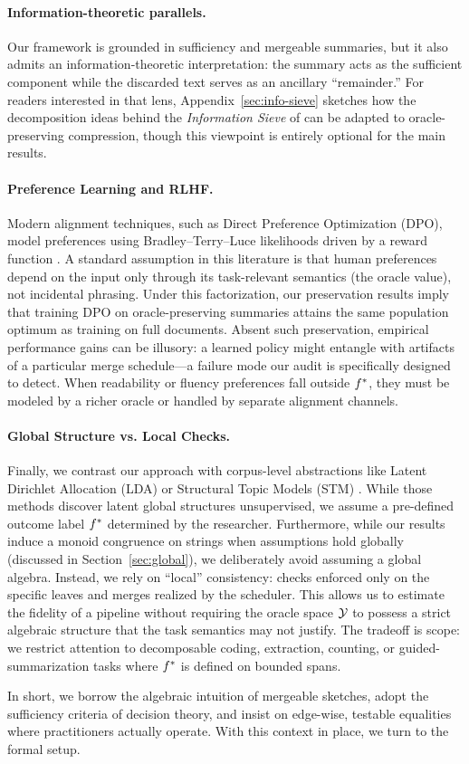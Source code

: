 \paragraph{Information-theoretic parallels.}
Our framework is grounded in sufficiency and mergeable summaries, but it also admits an information-theoretic interpretation: the summary acts as the sufficient component while the discarded text serves as an ancillary ``remainder.'' For readers interested in that lens, Appendix~\ref{sec:info-sieve} sketches how the decomposition ideas behind the \emph{Information Sieve} of \citet{steeg2016informationsieve} can be adapted to oracle-preserving compression, though this viewpoint is entirely optional for the main results.

\paragraph{Preference Learning and RLHF.}
Modern alignment techniques, such as Direct Preference Optimization (DPO), model preferences using Bradley–Terry–Luce likelihoods driven by a reward function \citep{BradleyTerry1952,RafailovEtAl2023DPO}. A standard assumption in this literature is that human preferences depend on the input only through its task-relevant semantics (the oracle value), not incidental phrasing. Under this factorization, our preservation results imply that training DPO on oracle-preserving summaries attains the same population optimum as training on full documents. Absent such preservation, empirical performance gains can be illusory: a learned policy might entangle with artifacts of a particular merge schedule---a failure mode our audit is specifically designed to detect. When readability or fluency preferences fall outside $f^{\ast}$, they must be modeled by a richer oracle or handled by separate alignment channels.

\paragraph{Global Structure vs. Local Checks.}
Finally, we contrast our approach with corpus-level abstractions like Latent Dirichlet Allocation (LDA) or Structural Topic Models (STM) \citep{BleiNgJordan2003,RobertsStewartTingley2014}. While those methods discover latent global structures unsupervised, we assume a pre-defined outcome label $f^{\ast}$ determined by the researcher.
Furthermore, while our results induce a monoid congruence on strings when assumptions hold globally (discussed in Section~\ref{sec:global}), we deliberately avoid assuming a global algebra. Instead, we rely on ``local'' consistency: checks enforced only on the specific leaves and merges realized by the scheduler. This allows us to estimate the fidelity of a pipeline without requiring the oracle space $\mathcal{Y}$ to possess a strict algebraic structure that the task semantics may not justify. The tradeoff is scope: we restrict attention to decomposable coding, extraction, counting, or guided-summarization tasks where $f^{\ast}$ is defined on bounded spans.

\bigskip
\noindent
In short, we borrow the algebraic intuition of mergeable sketches, adopt the sufficiency criteria of decision theory, and insist on edge-wise, testable equalities where practitioners actually operate. With this context in place, we turn to the formal setup.
